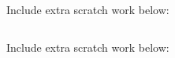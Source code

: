 \documentclass[12pt]{article}
\newcommand{\up}{$~$\vspace*{-0.7in}}
\newcommand{\liner}{\noindent\underline{\hspace*{7in}}}
\newcommand{\<}{\left<}
\renewcommand{\>}{\right>}
\begin{document}
\begin{enumerate}
\vspace*{8in}

\liner
\newpage

\centerline{Include extra scratch work below:}
\liner
\newpage\up

\centerline{Include extra scratch work below:}
\liner

\end{enumerate}
\end{document}
